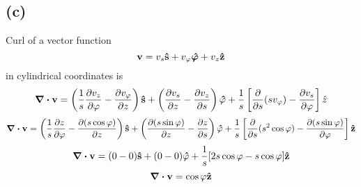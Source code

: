 \subsection*{(c)}
Curl of a vector function 
\[\vb{v}=v_s\vu{s}+v_{\varphi}\vu{\bm{\varphi}}+v_z\vu{z}\]  in cylindrical coordinates is \[\div{\vb{v}}=\left(\frac{1}{s}\pdv{v_z}{\varphi}-\pdv{v_{\varphi}}{z} \right )\vu{s}+\left(\pdv{v_s}{z}-\pdv{v_{z}}{s} \right )\vu{\varphi}+\frac{1}{s}\left[ \pdv{s}(s{v_{\varphi}})-\frac{\partial{v_s}}{\partial{\varphi}}\right ]\hat{z}\]
\[\div{\vb{v}}=\left(\frac{1}{s}\frac{\partial{z}}{\partial{\varphi}}-\frac{\partial{(s\cos{\varphi})}}{\partial{z}} \right )\vu{s}+\left(\frac{\partial{(s\sin{\varphi})}}{\partial{z}}-\frac{\partial{z}}{\partial{s}} \right )\vu{\varphi}+\frac{1}{s}\left[ \frac{\partial}{\partial{s}}(s^2\cos{\varphi})-\frac{\partial{(s\sin{\varphi})}}{\partial{\varphi}}\right ]\vu{z}\]
\[\div{\vb{v}}=(0-0)\vu{s}+(0-0)\vu{\varphi}+\frac{1}{s}[ 2s\cos{\varphi}-s\cos{\varphi} ]\vu{z}\]
\[\div{\vb{v}}=\cos{\varphi}\vu{z}\]